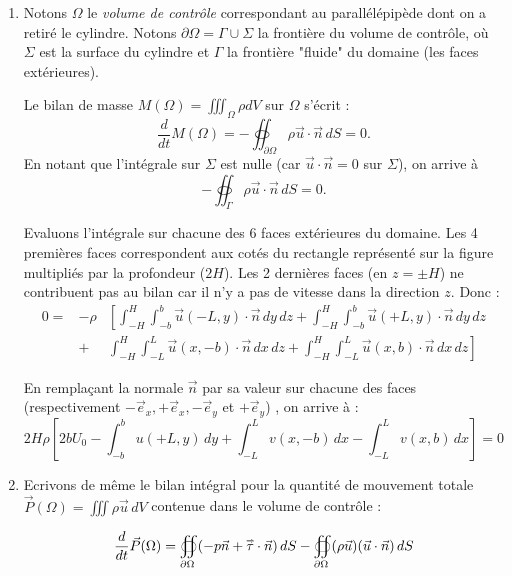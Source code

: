 \documentclass[10pt, a4paper]{article}
\begin{document}
\begin{enumerate}
\item Notons $\Omega$ le {\em volume de contrôle } correspondant au parallélépipède dont on a retiré le cylindre.
Notons $\partial \Omega = \Gamma \cup \Sigma$ la frontière du volume de contrôle, où $\Sigma$ est la surface du cylindre et 
$\Gamma$ la frontière "fluide" du domaine (les faces extérieures).


Le bilan de masse $M(\Omega) = \iiint_{\Omega} \rho dV$ sur $\Omega$ s'écrit :
$$
\frac{ d }{ d t} M(\Omega) = - \oiint_{\partial \Omega} \rho \vec u \cdot \vec n \,d S   = 0.
$$
En notant que l'intégrale sur $\Sigma$ est nulle (car $\vec u \cdot \vec n = 0$ sur $\Sigma$), on arrive à 
$$ - \oiint_{\Gamma} \rho \vec u \cdot \vec n \,d S = 0.
$$

Evaluons l'intégrale sur chacune des 6 faces extérieures du domaine. Les 4 premières faces correspondent aux cotés du rectangle représenté sur la figure multipliés par la profondeur ($ 2H$). Les 2 dernières faces (en $z = \pm H$) ne contribuent pas au bilan car il n'y a pas de vitesse dans la direction $z$. Donc : 
\begin{eqnarray*}
0  = &- \rho  &  \left[  \int_{-H}^H \int_{-b}^b  \vec u(-L,y) \cdot \vec n \, d y \, dz  + \int_{-H}^H \int_{-b}^b \vec u(+L,y) \cdot \vec n \, d y \, dz  \right.
\\
&+&\left.  \int_{-H}^H \int_{-L}^L \vec u (x,-b) \cdot \vec n \, dx  \, dz+ \int_{-H}^H \int_{-L}^L  \vec u (x,b) \cdot \vec n \, dx \, dz   \right]
\end{eqnarray*} 

En remplaçant la normale $\vec  n$ par sa valeur sur chacune des faces (respectivement $-\vec e_x, + \vec e_x, -\vec e_y$ et $+\vec e_y$) , on arrive à :
\begin{equation} 
2 H  \rho  \left[ 2 b U_0  - \int_{-b}^b u(+L,y) \, d y + \int_{-L}^L v(x,-b) \, dx - \int_{-L}^L v(x,b) \, dx  \right] = 0
 \label{eq:masse}
\end{equation}

\item 
Ecrivons de même le bilan intégral pour la quantité de mouvement totale $\vec P(\Omega) = \iiint \rho \vec u \, dV$ contenue dans le volume de contrôle :

$$
\frac{ d }{ d t} \vec{P}(\Omega) = \oiint_{\partial \Omega} (  - p \vec{n}  + \accentset{\Rightarrow}{\tau} \cdot \vec n ) \, dS -  \oiint_{\partial \Omega}  (\rho \vec u)  (\vec u \cdot \vec n) \,d S  
$$


\end{enumerate}
\end{document}
